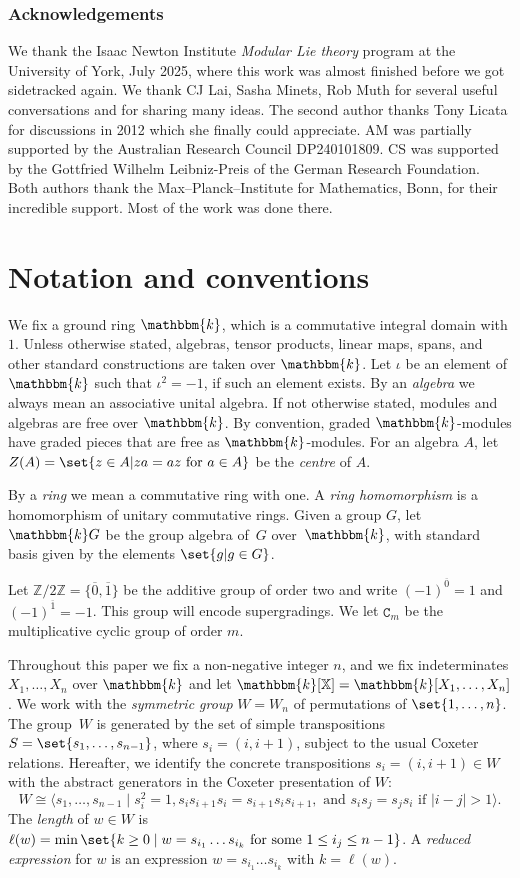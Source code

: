 \documentclass[a4paper,11pt]{amsart}
\let\<\langle
\let\>\rangle
\let\ov\overline
\numberwithin{equation}{subsection}
\theoremstyle{definition}
\theoremstyle{theorem}
\theoremstyle{remark}
\newcommand\Sym{W}
\newcommand\Ztwo{\mathbb{Z}/2\mathbb{Z}}
\newcommand\X{\mathbb{X}}
\newcommand\kk{\mathbbm{k}}
\begin{document}
\subsubsection*{Acknowledgements}
We thank the Isaac Newton Institute \textit{Modular Lie theory} program at the
University of York, July 2025, where this work was almost finished
before we got sidetracked again. We thank CJ Lai, Sasha Minets, Rob
Muth for several useful conversations and for sharing many ideas. The second author thanks Tony Licata for discussions in 2012 which she finally could appreciate. AM was partially
supported by the Australian Research Council DP240101809. CS was supported by the Gottfried Wilhelm Leibniz-Preis of the German Research Foundation. Both authors
thank the Max--Planck--Institute for Mathematics, Bonn, for their
incredible support. Most of the work was done there.

\section{Notation and conventions}\label{S:notation}
  We fix a ground ring $\kk$, which is a commutative integral domain
  with $1$. Unless otherwise stated, algebras, tensor products, linear maps,
  spans, and other standard constructions are taken over $\kk$. Let
  $\iota$ be an element of $\kk$ such that $\iota^2=-1$, if such an
  element exists. By an \emph{algebra} we always mean an associative unital algebra. If
  not otherwise stated, modules and algebras are free over $\kk$. By
  convention, graded $\kk$-modules have graded pieces that are free as
  $\kk$-modules.  For an
  algebra $A$, let $Z(A)=\set{z\in A|za=az\text{ for }a\in A}$ be the
  \emph{centre} of $A$.

  By a \emph{ring} we mean a commutative ring with one. A \emph{ring
  homomorphism} is a homomorphism of unitary commutative rings.
   Given a group $G$, let $\kk G$ be the group
  algebra of~$G$ over~$\kk$, with standard basis given by the elements
  $\set{g|g\in G}$.

 Let $\Ztwo=\{\ov{0},\ov{1}\}$ be the additive group of order two and
  write $({-1})^{\ov{0}}=1$ and $({-1})^{\ov{1}}=-1$. This group will
  encode supergradings.  We let $\mathtt{C}_m$ be the multiplicative cyclic group of order $m$.

  Throughout this paper we fix a non-negative integer $n$, and we
  fix indeterminates $X_1,\dots,X_n$ over $\kk$ and let
  $\kk[\X]=\kk[X_1,\dots, X_n]$. We work with the \emph{symmetric group}
  $\Sym=\Sym_n$ of permutations of $\set{1,\dots, n}$.  The group~$\Sym$
  is generated by the set of simple transpositions
  $S=\set{s_1,\dots,s_{n-1}}$, where $s_i=(i,i+1)$, subject to the usual
  Coxeter relations. Hereafter, we identify the concrete transpositions
  $s_i=(i,i+1)\in\Sym$ with the abstract generators in the Coxeter
  presentation of $\Sym$:
  \[
       \Sym\cong\bigl\<s_1,\dots,s_{n-1}\mid
            s_i^2=1, s_is_{i+1}s_i =s_{i+1}s_is_{i+1},
            \text{ and } s_is_j=s_js_i \text{ if }|i-j|>1\bigr\>.
  \]
  The \emph{length} of $w\in\Sym$ is
  $\ell(w)=\min\set{k\ge0\mid w=s_{i_1}\dots s_{i_k}\text{ for some }1\le i_j\le n-1}$. A
  \emph{reduced expression} for $w$ is an expression $w=s_{i_1}\dots
  s_{i_k}$ with $k=\ell(w)$.
\end{document}
